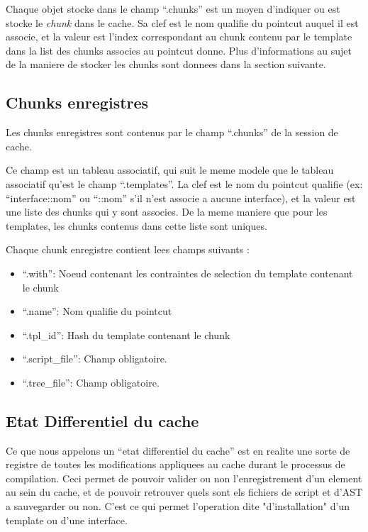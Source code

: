 \documentclass[french]{rtxreport}
\begin{document}
\begin{enumerate}
Chaque objet stocke dans le champ ``.chunks'' est un moyen d'indiquer ou est
stocke le \emph{chunk} dans le cache. Sa clef est le nom qualifie du pointcut
auquel il est associe, et la valeur est l'index correspondant au chunk contenu
par le template dans la list des chunks associes au pointcut donne. Plus
d'informations au sujet de la maniere de stocker les chunks sont donnees dans
la section suivante.


\subsection{Chunks enregistres}

Les chunks enregistres sont contenus par le champ ``.chunks'' de la session de
cache.

Ce champ est un tableau associatif, qui suit le meme modele que le tableau
associatif qu'est le champ ``.templates''. La clef est le nom du pointcut
qualifie (ex: ``interface::nom'' ou ``::nom'' s'il n'est associe a aucune
interface), et la valeur est une liste des chunks qui y sont associes. De la
meme maniere que pour les templates, les chunks contenus dans cette liste sont
uniques.

Chaque chunk enregistre contient lees champs suivants :
\begin{itemize}
    \item ``.with'': Noeud contenant les contraintes de selection du template
        contenant le chunk
    \item ``.name'': Nom qualifie du pointcut
    \item ``.tpl\_id'': Hash du template contenant le chunk
    \item ``.script\_file'': Champ obligatoire.
    \item ``.tree\_file'': Champ obligatoire.
\end{itemize}


\subsection{Etat Differentiel du cache}

Ce que nous appelons un ``etat differentiel du cache'' est en realite une sorte
de registre de toutes les modifications appliquees au cache durant le processus
de compilation. Ceci permet de pouvoir valider ou non l'enregistrement d'un
element au sein du cache, et de pouvoir retrouver quels sont els fichiers de
script et d'AST a sauvegarder ou non. C'est ce qui permet l'operation dite
"d'installation" d'un template ou d'une interface.


\end{enumerate}
\end{document}
